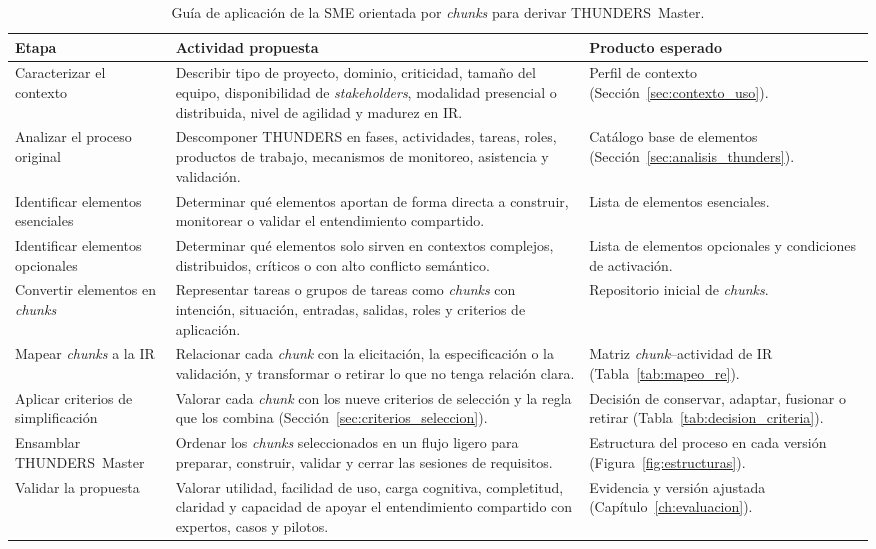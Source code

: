 \documentclass[12pt,letterpaper,oneside]{report}
\begin{document}
\begin{table}[H]
\caption{Guía de aplicación de la SME orientada por \textit{chunks} para derivar THUNDERS~Master.}
\label{tab:sme_application}
\centering
\footnotesize
\renewcommand{\arraystretch}{1.15}
\begin{tabularx}{\textwidth}{@{}L{3.3cm}Y Y@{}}
\toprule
\textbf{Etapa} & \textbf{Actividad propuesta} & \textbf{Producto esperado} \\
\midrule
Caracterizar el contexto &
Describir tipo de proyecto, dominio, criticidad, tamaño del equipo,
disponibilidad de \textit{stakeholders}, modalidad presencial o distribuida,
nivel de agilidad y madurez en IR. &
Perfil de contexto (Sección~\ref{sec:contexto_uso}). \\
Analizar el proceso original &
Descomponer THUNDERS en fases, actividades, tareas, roles, productos de
trabajo, mecanismos de monitoreo, asistencia y validación. &
Catálogo base de elementos (Sección~\ref{sec:analisis_thunders}). \\
Identificar elementos esenciales &
Determinar qué elementos aportan de forma directa a construir, monitorear o
validar el entendimiento compartido. &
Lista de elementos esenciales. \\
Identificar elementos opcionales &
Determinar qué elementos solo sirven en contextos complejos, distribuidos,
críticos o con alto conflicto semántico. &
Lista de elementos opcionales y condiciones de activación. \\
Convertir elementos en \textit{chunks} &
Representar tareas o grupos de tareas como \textit{chunks} con intención,
situación, entradas, salidas, roles y criterios de aplicación. &
Repositorio inicial de \textit{chunks}. \\
Mapear \textit{chunks} a la IR &
Relacionar cada \textit{chunk} con la elicitación, la especificación o la
validación, y transformar o retirar lo que no tenga relación clara. &
Matriz \textit{chunk}--actividad de IR (Tabla~\ref{tab:mapeo_re}). \\
Aplicar criterios de simplificación &
Valorar cada \textit{chunk} con los nueve criterios de selección y la regla que
los combina (Sección~\ref{sec:criterios_seleccion}). &
Decisión de conservar, adaptar, fusionar o retirar
(Tabla~\ref{tab:decision_criteria}). \\
Ensamblar THUNDERS~Master &
Ordenar los \textit{chunks} seleccionados en un flujo ligero para preparar,
construir, validar y cerrar las sesiones de requisitos. &
Estructura del proceso en cada versión (Figura~\ref{fig:estructuras}). \\
Validar la propuesta &
Valorar utilidad, facilidad de uso, carga cognitiva, completitud, claridad y
capacidad de apoyar el entendimiento compartido con expertos, casos y
pilotos. &
Evidencia y versión ajustada (Capítulo~\ref{ch:evaluacion}). \\
\bottomrule
\end{tabularx}
\end{table}
\end{document}
